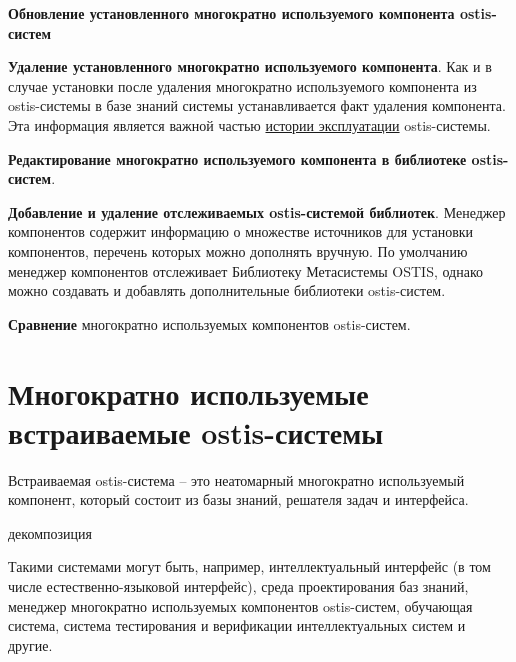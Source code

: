 \begin{textitemize}
	\item{\textbf{Обновление установленного многократно используемого компонента ostis-систем}}
	\item{\textbf{Удаление установленного многократно используемого компонента}. Как и в случае установки после удаления многократно используемого компонента из ostis-системы в базе знаний системы устанавливается факт удаления компонента. Эта информация является важной частью \underline{истории эксплуатации} ostis-системы.}
	\item{\textbf{Редактирование многократно используемого компонента в библиотеке ostis-систем}.}
	\item{\textbf{Добавление и удаление отслеживаемых ostis-системой библиотек}. Менеджер компонентов содержит информацию о множестве источников для установки компонентов, перечень которых можно дополнять вручную. По умолчанию менеджер компонентов отслеживает Библиотеку Метасистемы OSTIS, однако можно создавать и добавлять дополнительные библиотеки ostis-систем.}
	\item{\textbf{Сравнение} многократно используемых компонентов ostis-систем.}
\end{textitemize}

\section{Многократно используемые встраиваемые ostis-системы}
\label{ostis_library_embedded_systems}

Встраиваемая ostis-система -- это неатомарный многократно используемый компонент, который состоит из базы знаний, решателя задач и интерфейса. 

\begin{SCn}
\begin{scnrelfromset}{декомпозиция}
\end{scnrelfromset}
\end{SCn}

Такими системами могут быть, например, интеллектуальный интерфейс (в том числе естественно-языковой интерфейс), среда проектирования баз знаний, менеджер многократно используемых компонентов ostis-систем, обучающая система, система тестирования и верификации интеллектуальных систем и другие.

